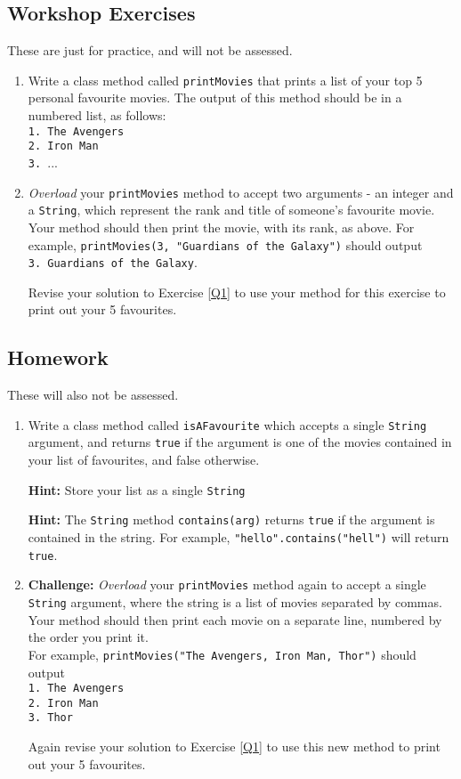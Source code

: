 \documentclass[a4paper]{article}
\begin{document}
%
\subsection*{Workshop Exercises}
These are just for practice, and will not be assessed.
\begin{enumerate}
\item Write a class method called \verb|printMovies| that prints a list of your top 5 personal favourite movies. The output of this method should be in a numbered list, as follows:\\
\verb|1. The Avengers|\\
\verb|2. Iron Man|\\
\verb|3. |...
\label{Q1}

\item \textit{Overload} your \verb|printMovies| method to accept two arguments - an integer and a \verb|String|, which represent the rank and title of someone's favourite movie. Your method should then print the movie, with its rank, as above. For example, \verb|printMovies(3, "Guardians of the Galaxy")| should output\\
 \verb|3. Guardians of the Galaxy|.

Revise your solution to Exercise \ref{Q1} to use your method for this exercise to print out your 5 favourites. 
\end{enumerate}

\subsection*{Homework}
These will also not be assessed.
\begin{enumerate}[resume]

\item Write a class method called \verb|isAFavourite| which accepts a single \verb|String| argument, and returns \verb|true| if the argument is one of the movies contained in your list of favourites, and false otherwise.

\textbf{Hint:} Store your list as a single \verb|String|

\textbf{Hint:} The \verb|String| method \verb|contains(arg)| returns \verb|true| if the argument is contained in the string. For example, \verb|"hello".contains("hell")| will return \verb|true|.
  
\item \textbf{Challenge:} \textit{Overload} your \verb|printMovies| method again to accept a single \verb|String| argument, where the string is a list of movies separated by commas. Your method should then print each movie on a separate line, numbered by the order you print it. \\
For example, \verb|printMovies("The Avengers, Iron Man, Thor")| should output\\
\verb|1. The Avengers|\\
\verb|2. Iron Man|\\
\verb|3. Thor|

Again revise your solution to Exercise \ref{Q1} to use this new method to print out your 5 favourites.
\end{enumerate}
\end{document}
